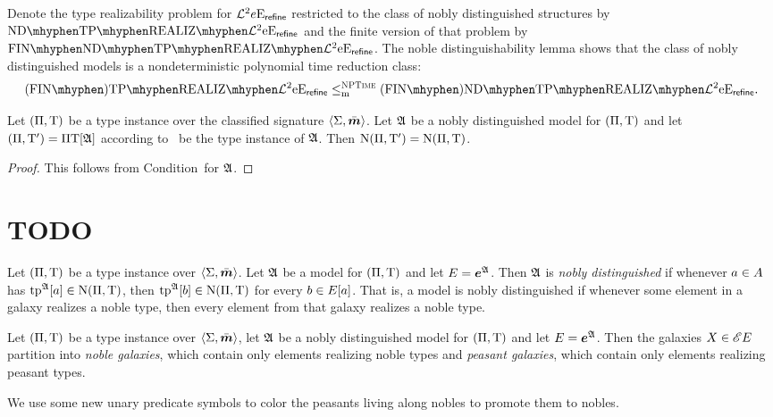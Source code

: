 Denote the type realizability problem for $\mathcal{L}^{2}{e}\mathrm{E}_{\mathsf{refine}}$ restricted to
the class of nobly distinguished structures by $\NDReal{\vFo2\Eea\sze\agrefine}$ and the finite
version of that problem by $\FinNDReal{\vFo2\Eea\sze\agrefine}$.
The noble distinguishability lemma shows that the class of nobly distinguished
models is a nondeterministic polynomial time reduction class:
\[
  \FinAReal{\vFo2\Eea\sze\agrefine} \red{\cNP} \FinANDReal{\vFo2\Eea\sze\agrefine}.
\]

\begin{remark}
Let $(\Pi,\mathrm{T})$ be a type instance over the classified signature
$\left\langle \mathrm{\Sigma},\bar{\bm{m}} \right\rangle$. Let $\mathfrak{A}$ be a nobly distinguished model for
$(\Pi,\mathrm{T})$ and let $(\Pi,{\mathrm{T}'}) = \Pi\mathrm{T}[\mathfrak{A}]$ according
to~ be the type instance of $\mathfrak{A}$. Then
$\mathrm{\mathrm{N}}(\Pi,{\mathrm{T}'}) = \mathrm{\mathrm{N}}(\Pi,\mathrm{T})$.
\end{remark}
\begin{proof}
This follows from Condition~ for $\mathfrak{A}$.
\end{proof}

\section{TODO}

\begin{definition}
Let $(\Pi,\mathrm{T})$ be a type instance over $\left\langle \mathrm{\Sigma},\bar{\bm{m}} \right\rangle$.
Let $\mathfrak{A}$ be a model for $(\Pi,\mathrm{T})$ and let $E = \bm{e}^{\mathfrak{A}}$.
Then $\mathfrak{A}$ is \emph{nobly distinguished} if whenever $a \in A$ has
$\operatorname{tp}^{\mathfrak{A}}[a] \in \mathrm{\mathrm{N}}(\Pi,\mathrm{T})$, 
then $\operatorname{tp}^{\mathfrak{A}}[b] \in \mathrm{\mathrm{N}}(\Pi,\mathrm{T})$ for every $b \in E[a]$.
That is, a model is nobly distinguished if whenever some element in a galaxy
realizes a noble type, then every element from that galaxy realizes a noble
type.
\end{definition}
\begin{remark}
Let $(\Pi,\mathrm{T})$ be a type instance over $\left\langle \mathrm{\Sigma},\bar{\bm{m}} \right\rangle$, let $\mathfrak{A}$ be a
nobly distinguished model for $(\Pi,\mathrm{T})$ and let $E = \bm{e}^{\mathfrak{A}}$.
Then the galaxies $X \in {\mathscr{E}E}$ partition into \emph{noble galaxies},
which contain only elements realizing noble types and \emph{peasant galaxies},
which contain only elements realizing peasant types.
\end{remark}

We use some new unary predicate symbols to color the peasants living along 
nobles to promote them to nobles.

